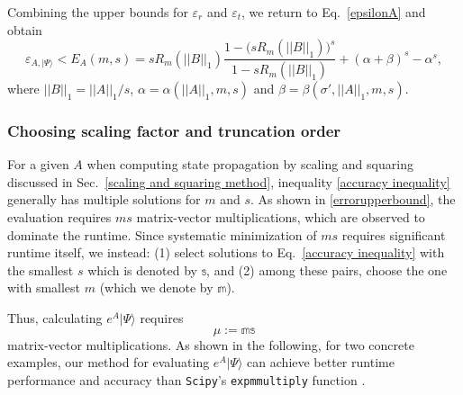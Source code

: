 \documentclass[12pt]{article}
\newcommand{\dket}[1]{|#1\rangle}
\renewcommand{\norm}[1]{\left|\left|#1\right|\right|}
\begin{document}
Combining the upper bounds for $\varepsilon_r$ and $\varepsilon_t$, we return to Eq.\ \eqref{epsilonA} and obtain
\begin{equation}
\label{overallupperbound}
\varepsilon_{A,\dket{\Psi}}<\nonumber E_A(m,s)=sR_m(\norm{B}_1)\frac{1-\big(sR_m(\norm{B}_1)\big)^s}{1-sR_m(\norm{B}_1)}+(\alpha+\beta)^s-\alpha^s,
\end{equation}
where $\norm{B}_1=\norm{A}_1/s$, $\alpha=\alpha(\norm{A}_1,m,s)$ and $\beta=\beta(\sigma',\norm{A}_1,m,s)$.

\subsubsection{Choosing scaling factor and truncation order}
For a given $A$ when computing state propagation by scaling and squaring discussed in Sec.\ \ref{scaling and squaring method}, inequality \ref{accuracy inequality} generally has multiple solutions for $m$ and $s$. As shown in  \ref{errorupperbound}, the evaluation requires $ms$ matrix-vector multiplications, which are observed to dominate the runtime. Since systematic minimization of $ms$ requires significant runtime itself, we instead: (1) select solutions to Eq.\ \eqref{accuracy inequality} with the smallest $s$ which is denoted by $\mathbb{s}$, and (2) among these pairs, choose the one with smallest $m$ (which we denote by $\mathbb{m}$). 

Thus, calculating $e^A\dket{\Psi}$ requires
\begin{equation}
\label{mudefnition}
    \mu:=\mathbb{m}\mathbb{s}
\end{equation}
matrix-vector multiplications. As shown in the following, for two concrete examples, our method for evaluating $e^A\dket{\Psi}$ can achieve better runtime performance and accuracy than \texttt{Scipy}'s \texttt{expm\textunderscore multiply} function \cite{al2011computing} .
\end{document}
